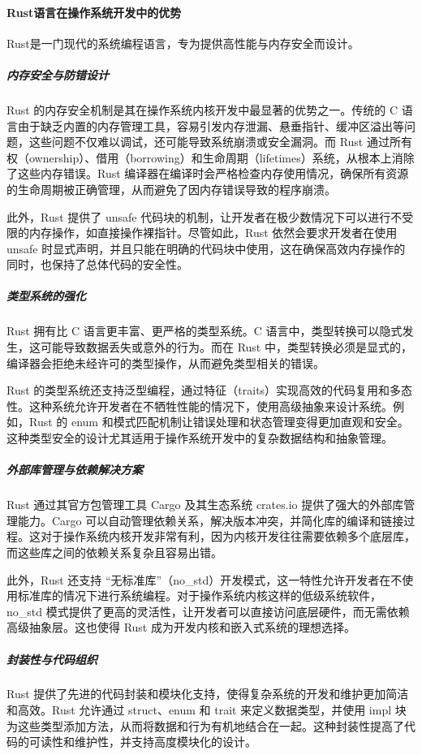 \paragraph{Rust语言在操作系统开发中的优势}

Rust是一门现代的系统编程语言，专为提供高性能与内存安全而设计。

\subparagraph{内存安全与防错设计}

Rust 的内存安全机制是其在操作系统内核开发中最显著的优势之一。传统的 C 语言由于缺乏内置的内存管理工具，容易引发内存泄漏、悬垂指针、缓冲区溢出等问题，这些问题不仅难以调试，还可能导致系统崩溃或安全漏洞。而 Rust 通过所有权（ownership）、借用（borrowing）和生命周期（lifetimes）系统，从根本上消除了这些内存错误。Rust 编译器在编译时会严格检查内存使用情况，确保所有资源的生命周期被正确管理，从而避免了因内存错误导致的程序崩溃。

此外，Rust 提供了 unsafe 代码块的机制，让开发者在极少数情况下可以进行不受限的内存操作，如直接操作裸指针。尽管如此，Rust 依然会要求开发者在使用 unsafe 时显式声明，并且只能在明确的代码块中使用，这在确保高效内存操作的同时，也保持了总体代码的安全性。

\subparagraph{类型系统的强化}

Rust 拥有比 C 语言更丰富、更严格的类型系统。C 语言中，类型转换可以隐式发生，这可能导致数据丢失或意外的行为。而在 Rust 中，类型转换必须是显式的，编译器会拒绝未经许可的类型操作，从而避免类型相关的错误。

Rust 的类型系统还支持泛型编程，通过特征（traits）实现高效的代码复用和多态性。这种系统允许开发者在不牺牲性能的情况下，使用高级抽象来设计系统。例如，Rust 的 enum 和模式匹配机制让错误处理和状态管理变得更加直观和安全。这种类型安全的设计尤其适用于操作系统开发中的复杂数据结构和抽象管理。

\subparagraph{外部库管理与依赖解决方案}

Rust 通过其官方包管理工具 Cargo 及其生态系统 crates.io 提供了强大的外部库管理能力。Cargo 可以自动管理依赖关系，解决版本冲突，并简化库的编译和链接过程。这对于操作系统内核开发非常有利，因为内核开发往往需要依赖多个底层库，而这些库之间的依赖关系复杂且容易出错。

此外，Rust 还支持 “无标准库”（no\_std）开发模式，这一特性允许开发者在不使用标准库的情况下进行系统编程。对于操作系统内核这样的低级系统软件，no\_std 模式提供了更高的灵活性，让开发者可以直接访问底层硬件，而无需依赖高级抽象层。这也使得 Rust 成为开发内核和嵌入式系统的理想选择。

\subparagraph{封装性与代码组织}

Rust 提供了先进的代码封装和模块化支持，使得复杂系统的开发和维护更加简洁和高效。Rust 允许通过 struct、enum 和 trait 来定义数据类型，并使用 impl 块为这些类型添加方法，从而将数据和行为有机地结合在一起。这种封装性提高了代码的可读性和维护性，并支持高度模块化的设计。


